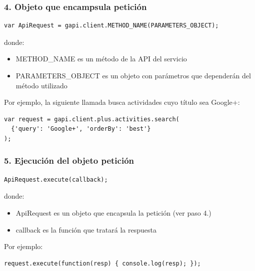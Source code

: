 
\begin{frame}[fragile]
\frametitle{4. Objeto que encampsula petición}

\begin{verbatim}
var ApiRequest = gapi.client.METHOD_NAME(PARAMETERS_OBJECT);
\end{verbatim}

donde:

\begin{itemize}
  \item METHOD\_NAME es un método de la API del servicio
  \item PARAMETERS\_OBJECT es un objeto con parámetros que dependerán 
del método utilizado
\end{itemize}

Por ejemplo, la siguiente llamada busca actividades cuyo título sea Google+:

\begin{verbatim}
var request = gapi.client.plus.activities.search(
  {'query': 'Google+', 'orderBy': 'best'}
);
\end{verbatim}


\end{frame}



\begin{frame}[fragile]
\frametitle{5. Ejecución del objeto petición}

\begin{verbatim}
ApiRequest.execute(callback);
\end{verbatim}

donde:

\begin{itemize}
  \item ApiRequest es un objeto que encapsula la petición (ver paso 4.)
  \item callback es la función que tratará la respuesta 
\end{itemize}

Por ejemplo:

\begin{verbatim}
request.execute(function(resp) { console.log(resp); });
\end{verbatim}

\end{frame}



